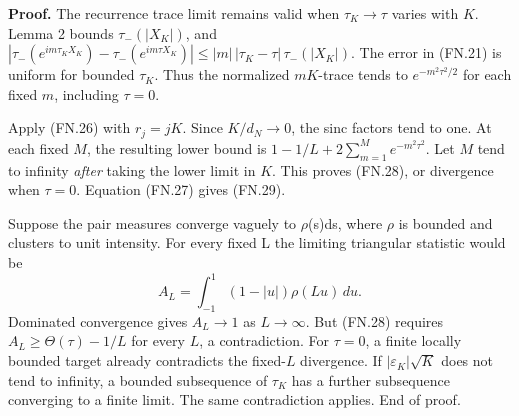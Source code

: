 \textbf{Proof.} The recurrence trace limit remains valid when \(\tau_K\to\tau\) varies with \(K\). Lemma 2 bounds \(\tau_-(|X_K|)\), and \(|\tau_-(e^{im\tau_KX_K})-\tau_-(e^{im\tau X_K})|\leq |m|\,|\tau_K-\tau|\,\tau_-(|X_K|)\). The error in (FN.21) is uniform for bounded \(\tau_K\). Thus the normalized \(mK\)-trace tends to \(e^{-m^2\tau^2/2}\) for each fixed \(m\), including \(\tau=0\).

Apply (FN.26) with \(r_j=jK\). Since \(K/d_N\to0\), the sinc factors tend to one. At each fixed \(M\), the resulting lower bound is \(1-1/L+2\sum_{m=1}^M e^{-m^2\tau^2}\). Let \(M\) tend to infinity \emph{after} taking the lower limit in \(K\). This proves (FN.28), or divergence when \(\tau=0\). Equation (FN.27) gives (FN.29).

Suppose the pair measures converge vaguely to \(\rho\)(s)ds, where \(\rho\) is bounded and clusters to unit intensity. For every fixed L the limiting triangular statistic would be \[
 A_L=\int_{-1}^1(1-|u|)\rho(Lu)\,du.
\] Dominated convergence gives \(A_L\to1\) as \(L\to\infty\). But (FN.28) requires \(A_L\geq\Theta(\tau)-1/L\) for every \(L\), a contradiction. For \(\tau=0\), a finite locally bounded target already contradicts the fixed-\(L\) divergence. If \(|\varepsilon_K|\sqrt K\) does not tend to infinity, a bounded subsequence of \(\tau_K\) has a further subsequence converging to a finite limit. The same contradiction applies. End of proof.

